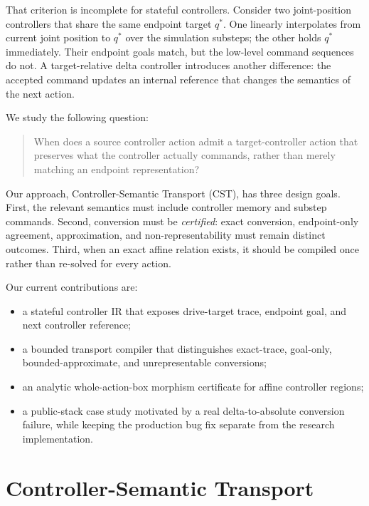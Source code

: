 \documentclass[conference]{IEEEtran}
\begin{document}
That criterion is incomplete for stateful controllers. Consider two
joint-position controllers that share the same endpoint target $q^*$.
One linearly interpolates from current joint position to $q^*$ over the
simulation substeps; the other holds $q^*$ immediately. Their endpoint goals
match, but the low-level command sequences do not. A target-relative delta
controller introduces another difference: the accepted command updates an
internal reference that changes the semantics of the next action.

We study the following question:
\begin{quote}
When does a source controller action admit a target-controller action that
preserves what the controller actually commands, rather than merely matching an
endpoint representation?
\end{quote}

Our approach, Controller-Semantic Transport (CST), has three design goals.
First, the relevant semantics must include controller memory and substep
commands. Second, conversion must be \emph{certified}: exact conversion,
endpoint-only agreement, approximation, and non-representability must remain
distinct outcomes. Third, when an exact affine relation exists, it should be
compiled once rather than re-solved for every action.

Our current contributions are:
\begin{itemize}
\item a stateful controller IR that exposes drive-target trace, endpoint goal,
and next controller reference;
\item a bounded transport compiler that distinguishes exact-trace,
goal-only, bounded-approximate, and unrepresentable conversions;
\item an analytic whole-action-box morphism certificate for affine controller
regions;
\item a public-stack case study motivated by a real delta-to-absolute
conversion failure, while keeping the production bug fix separate from the
research implementation.
\end{itemize}

\section{Controller-Semantic Transport}
\end{document}
